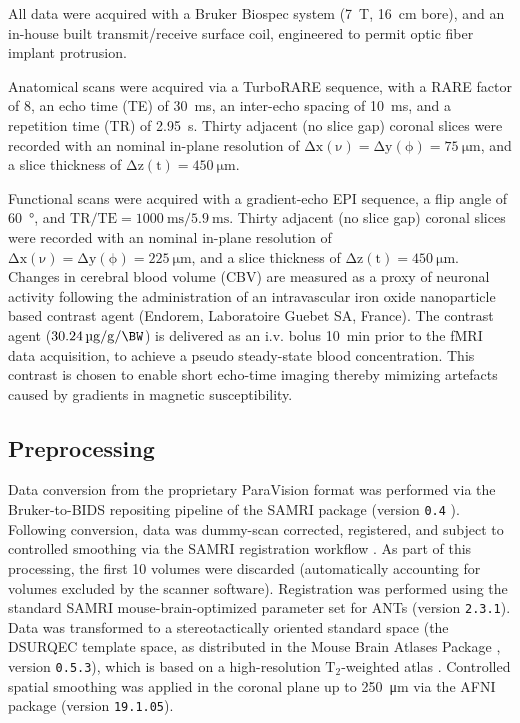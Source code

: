 All data were acquired with a Bruker Biospec system (\SI{7}{\tesla}, \SI{16}{\centi\meter} bore), and an in-house built transmit/receive surface coil, engineered to permit optic fiber implant protrusion.

Anatomical scans were acquired via a TurboRARE sequence, with a RARE factor of 8, an echo time (TE) of \SI{30}{\milli\second}, an inter-echo spacing of \SI{10}{\milli\second}, and a repetition time (TR) of \SI{2.95}{\second}.
Thirty adjacent (no slice gap) coronal slices were recorded with an nominal in-plane resolution of $\mathrm{\Delta x(\nu)=\Delta y(\phi)=\SI{75}{\micro\meter}}$, and a slice thickness of $\mathrm{\Delta z(t)=\SI{450}{\micro\meter}}$.

Functional scans were acquired with a gradient-echo EPI sequence, a flip angle of \SI{60}{\degree}, and $\mathrm{TR/TE = \SI{1000}{\milli\second}/\SI{5.9}{\milli\second}}$.
Thirty adjacent (no slice gap) coronal slices were recorded with an nominal in-plane resolution of $\mathrm{\Delta x(\nu)=\Delta y(\phi)=\SI{225}{\micro\meter}}$, and a slice thickness of $\mathrm{\Delta z(t)=\SI{450}{\micro\meter}}$.
Changes in cerebral blood volume (CBV) are measured as a proxy of neuronal activity following the administration of an intravascular iron oxide nanoparticle based contrast agent (Endorem, Laboratoire Guebet SA, France).
The contrast agent ($\SI{30.24}{\micro\gram\per\gram\per\BW}$) is delivered as an i.v. bolus \SI{10}{\minute} prior to the fMRI data acquisition, to achieve a pseudo steady-state blood concentration.
This contrast is chosen to enable short echo-time imaging thereby mimizing artefacts caused by gradients in magnetic susceptibility.

\subsection{Preprocessing}

Data conversion from the proprietary ParaVision format was performed via the Bruker-to-BIDS repositing pipeline \cite{aowsis} of the SAMRI package (version \textcolor{mg}{\texttt{0.4}} \cite{samri}).
Following conversion, data was dummy-scan corrected, registered, and subject to controlled smoothing via the SAMRI registration workflow \cite{irsabi}.
As part of this processing, the first 10 volumes were discarded (automatically accounting for volumes excluded by the scanner software).
Registration was performed using the standard SAMRI mouse-brain-optimized parameter set for ANTs \cite{ants} (version \textcolor{mg}{\texttt{2.3.1}}).
Data was transformed to a stereotactically oriented standard space (the DSURQEC template space, as distributed in the Mouse Brain Atlases Package \cite{atlases_generator}, version \textcolor{mg}{\texttt{0.5.3}}), which is based on a high-resolution $\mathrm{T_2}$-weighted atlas \cite{dsu1}.
Controlled spatial smoothing was applied in the coronal plane up to \SI{250}{\micro\meter} via the AFNI package \cite{afni} (version \textcolor{mg}{\texttt{19.1.05}}).

